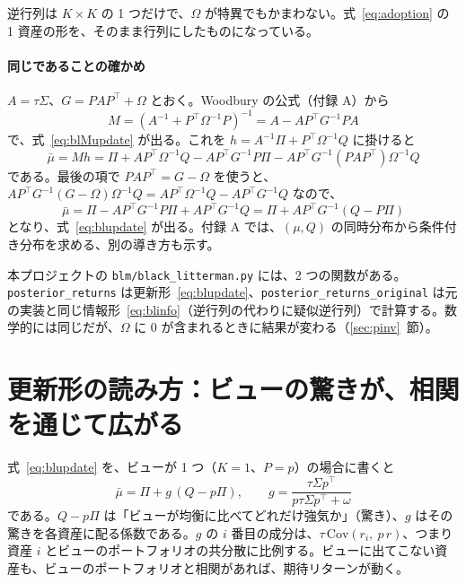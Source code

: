 \documentclass[xelatex,ja=standard,jafont=hiragino-pron,a4paper,11pt,openany]{bxjsreport}
\newcommand{\code}[1]{\texttt{#1}}
\newcommand{\T}{^{\top}}
\newcommand{\mub}{\bar{\mu}}
\newcommand{\secref}[1]{\ref{#1}~節}
\begin{document}
逆行列は $K \times K$ の 1 つだけで、$\Omega$ が特異でもかまわない。式~\eqref{eq:adoption} の 1 資産の形を、そのまま行列にしたものになっている。

\paragraph{同じであることの確かめ}
$A = \tau\Sigma$、$G = PAP\T + \Omega$ とおく。Woodbury の公式（付録 A）から
\[
M = (A^{-1} + P\T\Omega^{-1}P)^{-1} = A - AP\T G^{-1}PA
\]
で、式~\eqref{eq:blMupdate} が出る。これを $h = A^{-1}\Pi + P\T\Omega^{-1}Q$ に掛けると
\[
\mub = Mh = \Pi + AP\T\Omega^{-1}Q - AP\T G^{-1}P\Pi - AP\T G^{-1}(PAP\T)\Omega^{-1}Q
\]
である。最後の項で $PAP\T = G - \Omega$ を使うと、$AP\T G^{-1}(G - \Omega)\Omega^{-1}Q = AP\T\Omega^{-1}Q - AP\T G^{-1}Q$ なので、
\[
\mub = \Pi - AP\T G^{-1}P\Pi + AP\T G^{-1}Q = \Pi + AP\T G^{-1}(Q - P\Pi)
\]
となり、式~\eqref{eq:blupdate} が出る。付録 A では、$(\mu, Q)$ の同時分布から条件付き分布を求める、別の導き方も示す。

\begin{keybox}[本プロジェクトのコードとの対応]
本プロジェクトの \code{blm/black\_litterman.py} には、2 つの関数がある。\code{posterior\_returns} は更新形~\eqref{eq:blupdate}、\code{posterior\_returns\_original} は元の実装と同じ情報形~\eqref{eq:blinfo}（逆行列の代わりに疑似逆行列）で計算する。数学的には同じだが、$\Omega$ に 0 が含まれるときに結果が変わる（\secref{sec:pinv}）。
\end{keybox}

\section{更新形の読み方：ビューの驚きが、相関を通じて広がる}

式~\eqref{eq:blupdate} を、ビューが 1 つ（$K = 1$、$P = p$）の場合に書くと
\begin{equation}
\mub = \Pi + g\,(Q - p\Pi),\qquad
g = \frac{\tau\Sigma p\T}{p\tau\Sigma p\T + \omega}
\label{eq:gain}
\end{equation}
である。$Q - p\Pi$ は「ビューが均衡に比べてどれだけ強気か」（驚き）、$g$ はその驚きを各資産に配る係数である。$g$ の $i$ 番目の成分は、$\tau\,\mathrm{Cov}(r_i,\ p\,r)$、つまり資産 $i$ とビューのポートフォリオの共分散に比例する。ビューに出てこない資産も、ビューのポートフォリオと相関があれば、期待リターンが動く。
\end{document}
